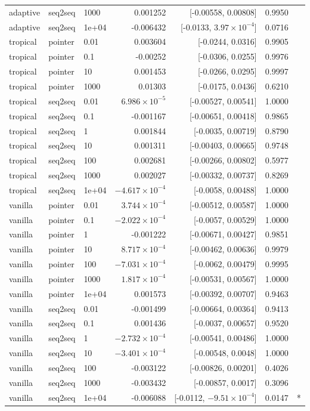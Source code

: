 \documentclass[10pt]{article}
\begin{document}
{\begin{longtable}{lllrrrl}
adaptive & seq2seq & 1000 & 0.001252 & [-0.00558, 0.00808] & 0.9950 & \\
adaptive & seq2seq & 1e+04 & -0.006432 & [-0.0133, $3.97\times10^{-4}$] & 0.0716 & \\
tropical & pointer & 0.01 & 0.003604 & [-0.0244, 0.0316] & 0.9905 & \\
tropical & pointer & 0.1 & -0.00252 & [-0.0306, 0.0255] & 0.9976 & \\
tropical & pointer & 10 & 0.001453 & [-0.0266, 0.0295] & 0.9997 & \\
tropical & pointer & 1000 & 0.01303 & [-0.0175, 0.0436] & 0.6210 & \\
tropical & seq2seq & 0.01 & $6.986\times10^{-5}$ & [-0.00527, 0.00541] & 1.0000 & \\
tropical & seq2seq & 0.1 & -0.001167 & [-0.00651, 0.00418] & 0.9865 & \\
tropical & seq2seq & 1 & 0.001844 & [-0.0035, 0.00719] & 0.8790 & \\
tropical & seq2seq & 10 & 0.001311 & [-0.00403, 0.00665] & 0.9748 & \\
tropical & seq2seq & 100 & 0.002681 & [-0.00266, 0.00802] & 0.5977 & \\
tropical & seq2seq & 1000 & 0.002027 & [-0.00332, 0.00737] & 0.8269 & \\
tropical & seq2seq & 1e+04 & $-4.617\times10^{-4}$ & [-0.0058, 0.00488] & 1.0000 & \\
vanilla & pointer & 0.01 & $3.744\times10^{-4}$ & [-0.00512, 0.00587] & 1.0000 & \\
vanilla & pointer & 0.1 & $-2.022\times10^{-4}$ & [-0.0057, 0.00529] & 1.0000 & \\
vanilla & pointer & 1 & -0.001222 & [-0.00671, 0.00427] & 0.9851 & \\
vanilla & pointer & 10 & $8.717\times10^{-4}$ & [-0.00462, 0.00636] & 0.9979 & \\
vanilla & pointer & 100 & $-7.031\times10^{-4}$ & [-0.0062, 0.00479] & 0.9995 & \\
vanilla & pointer & 1000 & $1.817\times10^{-4}$ & [-0.00531, 0.00567] & 1.0000 & \\
vanilla & pointer & 1e+04 & 0.001573 & [-0.00392, 0.00707] & 0.9463 & \\
vanilla & seq2seq & 0.01 & -0.001499 & [-0.00664, 0.00364] & 0.9413 & \\
vanilla & seq2seq & 0.1 & 0.001436 & [-0.0037, 0.00657] & 0.9520 & \\
vanilla & seq2seq & 1 & $-2.732\times10^{-4}$ & [-0.00541, 0.00486] & 1.0000 & \\
vanilla & seq2seq & 10 & $-3.401\times10^{-4}$ & [-0.00548, 0.0048] & 1.0000 & \\
vanilla & seq2seq & 100 & -0.003122 & [-0.00826, 0.00201] & 0.4026 & \\
vanilla & seq2seq & 1000 & -0.003432 & [-0.00857, 0.0017] & 0.3096 & \\
vanilla & seq2seq & 1e+04 & -0.006088 & [-0.0112, $-9.51\times10^{-4}$] & 0.0147 & *\\
\bottomrule
\end{longtable}
}
\end{document}

